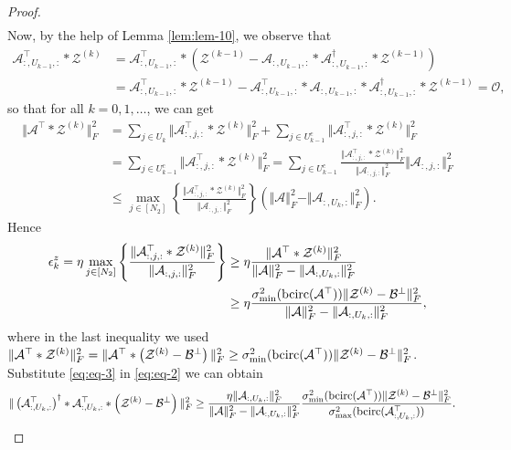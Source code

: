 \documentclass[11pt]{article}
\def\fm#1{\mathcal{#1}}
\def \a#1{\fm A_{:, #1, :}}
\begin{document}
\begin{proof}
\begin{align}
\end{align}
Now,  by the help of Lemma \ref{lem:lem-10}, we observe that
\begin{align*}
    \a{U_{k-1}}^\top *\fm Z^{(k)} & = \a{U_{k-1}}^\top *\left( \fm Z^{(k-1)} - \a{U_{k-1}}*\a{U_{k-1}}^\dagger * \fm Z^{(k-1)} \right)\\
    & =  \a{U_{k-1}}^\top*\fm Z^{(k-1)} - \a{U_{k-1}}^\top *\a{U_{k-1}} * \a{U_{k-1}}^\dagger* \fm Z^{(k-1)} = \fm O,
\end{align*}
so that for all $k=0, 1, \ldots$, we can get
\begin{align*}
    \Vert \fm A^\top * \fm Z^{(k)}\Vert_F^2  & = \sum_{j \in U_k} \Vert \a j ^\top  * \fm Z^{(k)} \Vert_F^2 + \sum_{j\in U^c_{k-1}}\Vert \a j ^\top  * \fm Z^{(k)} \Vert_F^2 \\
    &=  \sum_{j\in U^c_{k-1}}\Vert \a j ^\top  * \fm Z^{(k)} \Vert_F^2  =  \sum_{j\in U^c_{k-1}} \frac{ \Vert \a j ^\top  * \fm Z^{(k)} \Vert_F^2}{ \Vert \a j \Vert_F^2}\Vert \a j \Vert_F^2\\
    & \leq \max_{j \in [N_2]}\left\{  \frac{ \Vert \a j ^\top  * \fm Z^{(k)} \Vert_F^2}{ \Vert \a j \Vert_F^2} \right\}\left(\Vert \fm A \Vert_F^2 - \Vert \a{U_k} \Vert_F^2 \right).
\end{align*}
Hence
\begin{align}
    \epsilon^z_k = \eta \max_{j \in [N_2]}\left\{  \frac{ \Vert \a j ^\top  * \fm Z^{(k)} \Vert_F^2}{ \Vert \a j \Vert_F^2} \right\} &\geq \eta \frac{ \Vert \fm A^\top * \fm Z^{(k)}\Vert_F^2}{\Vert \fm A \Vert_F^2 - \Vert \a{U_k} \Vert_F^2} \notag\\
    & \geq \eta\frac{ \sigma_{\min}^2(\bcirc(\fm A^\top)) \Vert \fm Z^{(k)}-\fm B^\perp \Vert_F^2}{\Vert \fm A \Vert_F^2 - \Vert \a{U_k} \Vert_F^2},  \label{eq:eq-3}
\end{align}
where in the last inequality we used $ \Vert \fm A^\top *  \fm Z^{(k)}\Vert_F^2 =  \Vert \fm A^\top * \left( \fm Z^{(k)} - \fm B^\perp \right)\Vert_F^2 \geq \sigma_{\min}^2(\bcirc(\fm A^\top)) \Vert \fm Z^{(k)}-\fm B^\perp \Vert_F^2 $.\\
Substitute \eqref{eq:eq-3} in \eqref{eq:eq-2} we can obtain
\begin{align}
     \Vert \left(\a{U_k}^\top \right)^\dagger * \a{U_k}^\top *\left(\fm Z^{(k)}-\fm B^\perp \right) \Vert_F^2 & \geq \frac{\eta \Vert \a{U_k} \Vert_F^2}{\Vert \fm A \Vert_F^2 - \Vert \a{U_k} \Vert_F^2} \frac{\sigma_{\min}^2(\bcirc(\fm A^\top)) \Vert \fm Z^{(k)}-\fm B^\perp \Vert_F^2}{\sigma_{\max}^2(\bcirc(\a{U_k}^\top))}. \label{eq:eq-4}

\end{align}
\end{proof}
\end{document}
